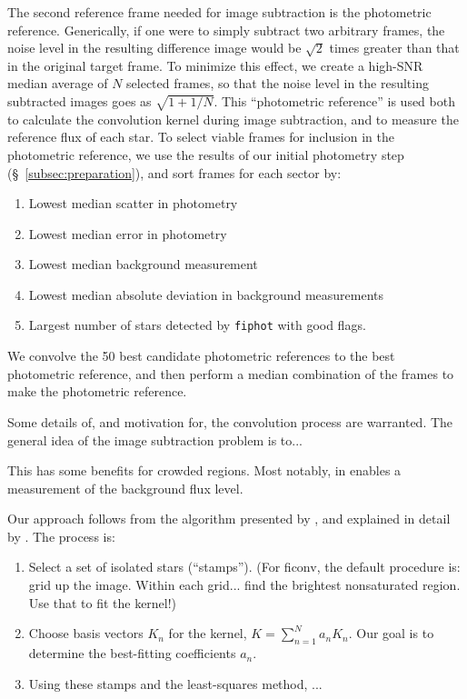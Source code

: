 \documentclass[12pt,twocolumn,tighten]{aastex62}
\begin{document}
The second reference frame needed for image subtraction is the
photometric reference.  Generically, if one were to simply subtract
two arbitrary frames, the noise level in the resulting difference
image would be $\sqrt{2}$ times greater than that in the original
target frame.
To minimize this effect, we create a high-SNR median average of
$N$ selected frames, so that the noise level in the resulting
subtracted images goes as $\sqrt{1+1/N}$.
This ``photometric reference'' is used both to calculate the
convolution kernel during image subtraction, and to measure the
reference flux of each star.
To select viable frames for inclusion in the photometric reference, we
use the results of our initial photometry step
(\S~\ref{subsec:preparation}), and sort frames for each sector by:
\begin{enumerate}
  \item Lowest median scatter in photometry
  \item Lowest median error in photometry
  \item Lowest median background measurement
  \item Lowest median absolute deviation in background measurements
  \item Largest number of stars detected by \texttt{fiphot} with good
    flags.
\end{enumerate}
We convolve the 50 best candidate photometric references to the best
photometric reference, and then perform a median combination of the
frames to make the photometric reference.


Some details of, and motivation for, the convolution process are warranted.
The general idea of the image subtraction problem is to...

This has some benefits for crowded regions. Most notably, in enables a
measurement of the background flux level.

Our approach follows from the algorithm presented by
\citet{Alard_Lupton_1998}, and explained in detail by
\citet{miller_optimal_2008}.
The process is: %
\begin{enumerate}
  \item Select a set of isolated stars (``stamps'').
  (For ficonv, the default procedure is: grid up the image. Within
    each grid... find the brightest nonsaturated region. Use that to
    fit the kernel!)
  \item Choose basis vectors $K_n$ for the kernel, $K = \sum_{n=1}^N
    a_n K_n$. Our goal is to determine the best-fitting coefficients
    $a_n$. 
  \item Using these stamps and the least-squares method, ...
\end{enumerate}
\end{document}
